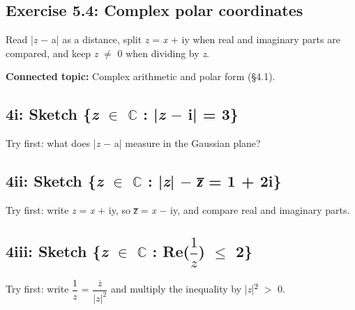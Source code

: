 \documentclass[11pt]{article}
\begin{document}
\begin{keepsection}
\section{Exercise 5.4: Complex polar coordinates}

Read |\textit{z} \ensuremath{-} a| as a distance, split \textit{z} = \textit{x} + iy when real and imaginary parts are compared, and keep \textit{z} \ensuremath{\neq} 0 when dividing by \textit{z}.

\textbf{Connected topic:} Complex arithmetic and polar form (§4.1).

\begin{keepsection}
\subsection{4i: Sketch \{\textit{z} \ensuremath{\in} \ensuremath{\mathbb{C}} : |\textit{z} \ensuremath{-} i| = 3\}}

Try first: what does |\textit{z} \ensuremath{-} a| measure in the Gaussian plane?

\end{keepsection}

\begin{keepsection}
\subsection{4ii: Sketch \{\textit{z} \ensuremath{\in} \ensuremath{\mathbb{C}} : |\textit{z}| \ensuremath{-} \textit{z̅} = 1 + 2i\}}

Try first: write \textit{z} = \textit{x} + iy, so \textit{z̅} = \textit{x} \ensuremath{-} iy, and compare real and imaginary parts.

\end{keepsection}

\begin{keepsection}
\subsection{4iii: Sketch \{\textit{z} \ensuremath{\in} \ensuremath{\mathbb{C}} : Re({\small\ensuremath{\dfrac{1}{{z}}}}) \ensuremath{\leq} 2\}}

Try first: write {\small\ensuremath{\dfrac{1}{{z}}}} = {\small\ensuremath{\dfrac{{\overline{z}}}{|{z}|^{2}}}} and multiply the inequality by |\textit{z}|\textsuperscript{2} \ensuremath{>} 0.

\end{keepsection}
\end{keepsection}
\end{document}
